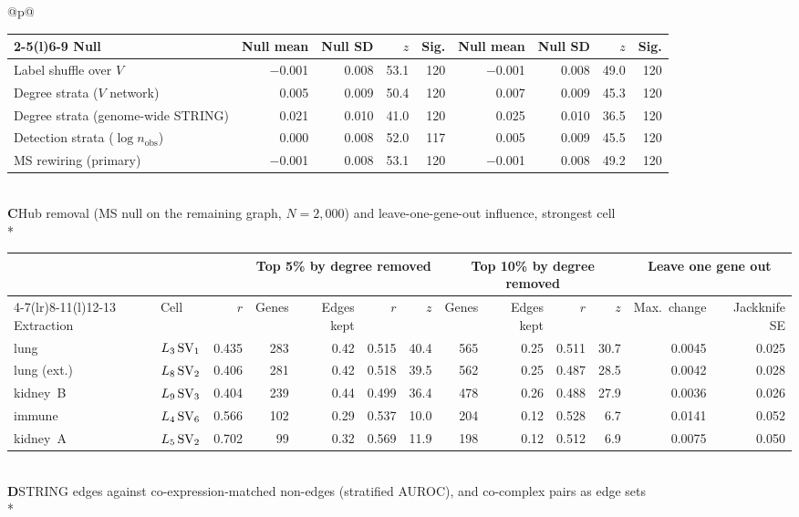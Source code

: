\begin{longtable}{@{}p{\textwidth}@{}}
{\begin{tabular*}{\textwidth}{@{\extracolsep{\fill}}lrrrrrrrr@{}}
\cmidrule(lr){2-5}\cmidrule(l){6-9}
Null & Null mean & Null SD & $z$ & Sig. & Null mean & Null SD & $z$ & Sig. \\
\midrule
Label shuffle over $V$ & $-$0.001 & 0.008 & 53.1 & 120 & $-$0.001 & 0.008 & 49.0 & 120 \\
Degree strata ($V$ network) & 0.005 & 0.009 & 50.4 & 120 & 0.007 & 0.009 & 45.3 & 120 \\
Degree strata (genome-wide STRING) & 0.021 & 0.010 & 41.0 & 120 & 0.025 & 0.010 & 36.5 & 120 \\
Detection strata ($\log n_{\mathrm{obs}}$) & 0.000 & 0.008 & 52.0 & 117 & 0.005 & 0.009 & 45.5 & 120 \\
MS rewiring (primary) & $-$0.001 & 0.008 & 53.1 & 120 & $-$0.001 & 0.008 & 49.2 & 120 \\
\end{tabular*}}\\
\midrule
\textbf{C}\enspace Hub removal (MS null on the remaining graph, $N = 2{,}000$) and leave-one-gene-out influence, strongest cell\\*
{\scriptsize\begin{tabular*}{\textwidth}{@{\extracolsep{\fill}}llrrrrrrrrrrr@{}}
& & & \multicolumn{4}{c}{Top 5\% by degree removed} & \multicolumn{4}{c}{Top 10\% by degree removed} & \multicolumn{2}{c}{Leave one gene out} \\
\cmidrule(lr){4-7}\cmidrule(lr){8-11}\cmidrule(l){12-13}
Extraction & Cell & $r$ & Genes & Edges kept & $r$ & $z$ & Genes & Edges kept & $r$ & $z$ & Max.\ change & Jackknife SE \\
\midrule
lung & $L_{3}\,\mathrm{SV}_{1}$ & 0.435 & 283 & 0.42 & 0.515 & 40.4 & 565 & 0.25 & 0.511 & 30.7 & 0.0045 & 0.025 \\
lung (ext.) & $L_{8}\,\mathrm{SV}_{2}$ & 0.406 & 281 & 0.42 & 0.518 & 39.5 & 562 & 0.25 & 0.487 & 28.5 & 0.0042 & 0.028 \\
kidney~B & $L_{9}\,\mathrm{SV}_{3}$ & 0.404 & 239 & 0.44 & 0.499 & 36.4 & 478 & 0.26 & 0.488 & 27.9 & 0.0036 & 0.026 \\
immune & $L_{4}\,\mathrm{SV}_{6}$ & 0.566 & 102 & 0.29 & 0.537 & 10.0 & 204 & 0.12 & 0.528 & 6.7 & 0.0141 & 0.052 \\
kidney~A & $L_{5}\,\mathrm{SV}_{2}$ & 0.702 & 99 & 0.32 & 0.569 & 11.9 & 198 & 0.12 & 0.512 & 6.9 & 0.0075 & 0.050 \\
\end{tabular*}}\\
\midrule
\textbf{D}\enspace STRING edges against co-expression-matched non-edges (stratified AUROC), and co-complex pairs as edge sets\\*

\end{longtable}
